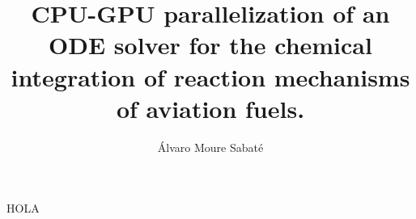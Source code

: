 \documentclass[11pt,a4paper]{book}
\author{Álvaro Moure Sabaté}
\title{CPU-GPU parallelization of an ODE solver for the chemical integration of reaction mechanisms of aviation fuels.}
\begin{document}
HOLA
\end{document}
